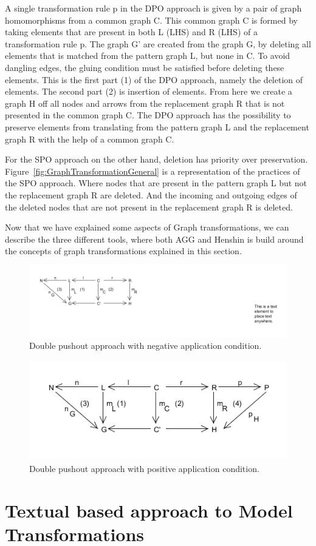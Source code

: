 A single transformation rule p in the DPO approach is given by a pair of graph
homomorphisms from a common graph C. This common graph C is formed by taking
elements that are present in both L (LHS) and R (LHS) of a transformation rule
p. The graph G' are created from the graph G, by deleting all elements that is
matched from the pattern graph L, but none in C. To avoid dangling edges,
the gluing condition must be satisfied before deleting these elements. This is
the first part (1) of the DPO approach, namely the deletion of elements. The
second part (2) is insertion of elements. From here we create a graph H off all
nodes and arrows from the replacement graph R that is not presented in the
common graph C. The DPO approach has the possibility to preserve elements from
translating from the pattern graph L and the replacement graph R with the help
of a common graph C.

For the SPO approach on the other hand, deletion has priority over preservation.
Figure~\ref{fig:GraphTransformationGeneral} is a representation of the practices
of the SPO approach. Where nodes that are present in the pattern graph L but not
the replacement graph R are deleted. And the incoming and outgoing edges of the
deleted nodes that are not present in the replacement graph R is deleted.

Now that we have explained some aspects of Graph transformations, we can
describe the three different tools, where both AGG and Henshin is build around
the concepts of graph transformations explained in this section. 

\begin{figure}[H]
	\centering
	\includegraphics[scale=0.7]{./Figures/Double_Pushout_NAC.png}
	\caption[The Double Pushout approach with NAC]
	{Double pushout approach with negative application condition.}
	\label{fig:DPO_NAC}
\end{figure}

\begin{figure}[H]
	\centering
	\includegraphics[scale=0.7]{./Figures/Double_Pushout_PAC.png}
	\caption[The Double Pushout approach with PAC]
	{Double pushout approach with positive application condition.}
	\label{fig:DPO_NAC}
\end{figure}

\section{Textual based approach to Model Transformations}




